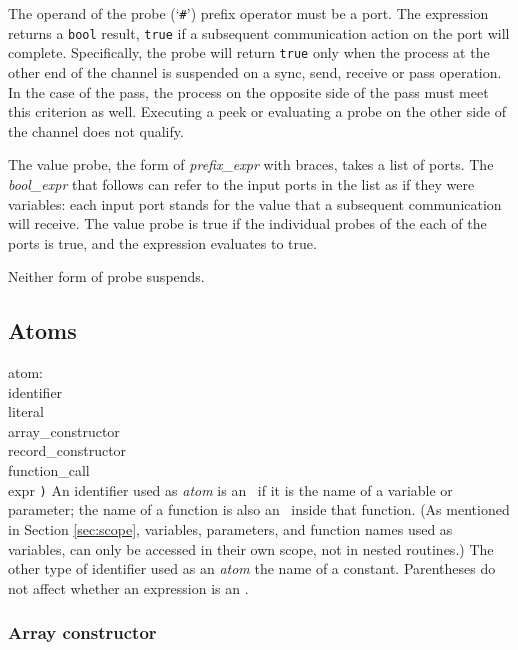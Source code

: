 The operand of the probe (`{\tt{}\#}') prefix operator must be a port.
The expression
returns a {\tt{}bool} result, {\tt{}true} if a subsequent communication
action on the port will complete.  Specifically, the probe will return
{\tt{}true} only when the process at the other end of the channel is
suspended on a sync, send, receive or pass operation.  In the case of
the pass, the process on the opposite side of the pass must meet this
criterion as well.  Executing a peek or evaluating a probe on the other
side of the channel does not qualify.

The value probe, the form of {\it{}prefix\_expr} with braces, takes a list
of ports. The {\it{}bool\_expr} that follows can refer to the input ports in the
list as if they were variables: each input port stands for the value that
a subsequent communication will receive. The value probe is true if the
individual probes of the each of the ports is true, and the expression
evaluates to true.

Neither form of probe suspends.


\subsection{Atoms}\label{sec:atoms}

\grammarstart
atom: \\
       \>identifier \\
\orbox \>literal \\
\orbox \>array\_constructor \\
\orbox \>record\_constructor \\
\orbox \>function\_call \\
\orbox \>{\tt{}(} expr {\tt{})}
\grammarend
An identifier used as {\it{}atom} is an \lvalue\ if it is the name of
a variable or parameter; the name of a function is also an \lvalue\ inside
that function. (As mentioned in Section \ref{sec:scope}, variables, parameters,
and function names used as variables, can only be accessed in their own
scope, not in nested routines.)
The other type of identifier used as an {\it{}atom} the name of
a constant. Parentheses do not affect whether
an expression is an \lvalue.

\subsubsection{Array constructor}\label{sec:arrayconstruct}

